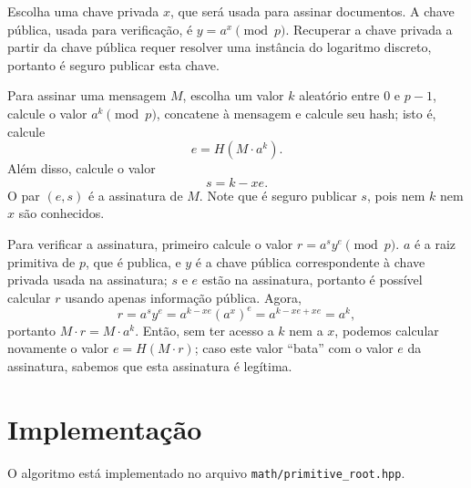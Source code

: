 \documentclass{article}
\theoremstyle{definition}
\begin{document}
Escolha uma chave privada $x$,
que será usada para assinar documentos.
A chave pública,
usada para verificação,
é $y = a^x \pmod p$.
Recuperar a chave privada a partir da chave pública
requer resolver uma instância do logaritmo discreto,
portanto é seguro publicar esta chave.

Para assinar uma mensagem $M$,
escolha um valor $k$ aleatório entre $0$ e $p-1$,
calcule o valor $a^k \pmod p$,
concatene à mensagem e calcule seu hash;
isto é,
calcule
\begin{equation*}
    e = H( M \cdot a^k ).
\end{equation*}
Além disso,
calcule o valor
\begin{equation*}
    s = k - xe.
\end{equation*}
O par $(e, s)$ é a assinatura de $M$.
Note que é seguro publicar $s$,
pois nem $k$ nem $x$ são conhecidos.

Para verificar a assinatura,
primeiro calcule o valor $r = a^s y^e \pmod p$.
$a$ é a raiz primitiva de $p$, que é publica,
e $y$ é a chave pública correspondente à chave privada usada na assinatura;
$s$ e $e$ estão na assinatura,
portanto é possível calcular $r$ usando apenas informação pública.
Agora,
\begin{equation*}
    r = a^s y^e = a^{k - xe} (a^x)^e = a^{k - xe + xe} = a^k,
\end{equation*}
portanto $M \cdot r = M \cdot a^k$.
Então,
sem ter acesso a $k$ nem a $x$,
podemos calcular novamente o valor $e = H(M \cdot r)$;
caso este valor ``bata'' com o valor $e$ da assinatura,
sabemos que esta assinatura é legítima.

\section{Implementação}

O algoritmo está implementado no arquivo \verb"math/primitive_root.hpp".
\end{document}
